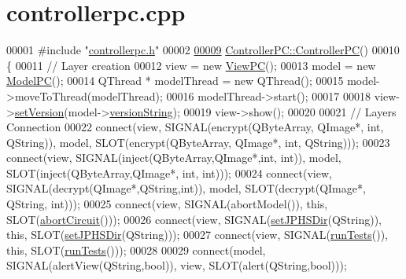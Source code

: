 \hypertarget{controllerpc_8cpp_source}{}\section{controllerpc.\+cpp}

\begin{DoxyCode}
00001 \textcolor{preprocessor}{#include "\hyperlink{controllerpc_8h}{controllerpc.h}"}
00002 
\hypertarget{controllerpc_8cpp_source.tex_l00009}{}\hyperlink{class_controller_p_c_afa6c92d67bf3b6531c42385fc5938003}{00009} \hyperlink{class_controller_p_c_afa6c92d67bf3b6531c42385fc5938003}{ControllerPC::ControllerPC}()
00010 \{
00011     \textcolor{comment}{// Layer creation}
00012     view = \textcolor{keyword}{new} \hyperlink{class_view_p_c}{ViewPC}();
00013     model = \textcolor{keyword}{new} \hyperlink{class_model_p_c}{ModelPC}();
00014     QThread * modelThread = \textcolor{keyword}{new} QThread();
00015     model->moveToThread(modelThread);
00016     modelThread->start();
00017 
00018     view->\hyperlink{class_view_p_c_ac05220df875b7c4f24405a5742476ebf}{setVersion}(model->\hyperlink{class_model_p_c_a5f426725ccf7eefd3c77ea8c720264c9}{versionString});
00019     view->show();
00020 
00021     \textcolor{comment}{// Layers Connection}
00022     connect(view, SIGNAL(encrypt(QByteArray, QImage*, \textcolor{keywordtype}{int}, QString)), model, SLOT(encrypt(QByteArray, 
      QImage*, \textcolor{keywordtype}{int}, QString)));
00023     connect(view, SIGNAL(inject(QByteArray,QImage*,\textcolor{keywordtype}{int}, \textcolor{keywordtype}{int})), model, SLOT(inject(QByteArray,QImage*, \textcolor{keywordtype}{int}, \textcolor{keywordtype}{
      int})));
00024     connect(view, SIGNAL(decrypt(QImage*,QString,\textcolor{keywordtype}{int})), model, SLOT(decrypt(QImage*, QString, \textcolor{keywordtype}{int})));
00025     connect(view, SIGNAL(abortModel()), \textcolor{keyword}{this}, SLOT(\hyperlink{class_controller_p_c_a8814989f7be1214e06b2e720889066b0}{abortCircuit}()));
00026     connect(view, SIGNAL(\hyperlink{class_controller_p_c_ac00d29685a7e5b780c01eb438e10f96d}{setJPHSDir}(QString)), \textcolor{keyword}{this}, SLOT(\hyperlink{class_controller_p_c_ac00d29685a7e5b780c01eb438e10f96d}{setJPHSDir}(QString)));
00027     connect(view, SIGNAL(\hyperlink{class_controller_p_c_aaa59fc90e1ef731eee4560ec87e43707}{runTests}()), \textcolor{keyword}{this}, SLOT(\hyperlink{class_controller_p_c_aaa59fc90e1ef731eee4560ec87e43707}{runTests}()));
00028 
00029     connect(model, SIGNAL(alertView(QString,\textcolor{keywordtype}{bool})), view, SLOT(alert(QString,\textcolor{keywordtype}{bool})));

\end{DoxyCode}
